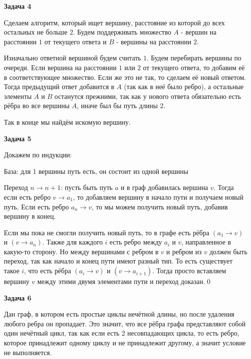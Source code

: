\begin{center}
\textbf{Задача 4}
\end{center}
Сделаем алгоритм, который ищет вершину, расстояние из которой до всех остальных не больше $\displaystyle 2$. Будем поддерживать множество $\displaystyle A$ - вершин на расстоянии $\displaystyle 1$ от текущего ответа и $\displaystyle B$ - вершины на расстоянии $\displaystyle 2$. 

Изначально ответной вершиной будем считать $\displaystyle 1$. Будем перебирать вершины по очереди. Если вершина на расстоянии $\displaystyle 1$ или $\displaystyle 2$ от текущего ответа, то добавим её в соответствующее множество. Если же это не так, то сделаем её новый ответом. Тогда предыдущий ответ добавится в $\displaystyle A$ (так как в неё было ребро), а остальные элементы $\displaystyle A$ и $\displaystyle B$ останутся прежними, так как у нового ответа обязательно есть рёбра во все вершины $\displaystyle A$, иначе был бы путь длины $\displaystyle 2$.

Так в конце мы найдём искомую вершину.

\begin{center}
\textbf{Задача 5}
\end{center}
Докажем по индукции:

База: для 1 вершины путь есть, он состоит из одной вершины

Переход $\displaystyle n\rightarrow n+1$: пусть быть путь $\displaystyle a$ и в граф добавилась вершина $\displaystyle v$. Тогда если есть ребро $\displaystyle v\rightarrow a_{1}$, то добавляем вершину в начало пути и получаем новый путь. Если есть ребро $\displaystyle a_{n}\rightarrow v$, то мы можем получить новый путь, добавив вершину в конец.

Если мы пока не смогли получить новый путь, то в графе есть рёбра $\displaystyle \left( a_{1}\rightarrow v\right)$ и $\displaystyle \left( v\rightarrow a_{n}\right)$. Также для каждого $\displaystyle i$ есть ребро между $\displaystyle a_{i}$ и $\displaystyle v$, направленное в какую-то сторону. Но между вершинами с ребром в $\displaystyle v$ и ребром из $\displaystyle v$ должен быть переход, так как начало и конец пути имеют разный тип. То есть существует такое $\displaystyle i$, что есть рёбра $\displaystyle \left( a_{i}\rightarrow v\right)$ и $\displaystyle \left( v\rightarrow a_{i+1}\right)$. Тогда просто вставляем вершину $\displaystyle v$ между этими двумя элементами пути и переход доказан.\qed 

\begin{center}
\textbf{Задача 6}
\end{center}
Дан граф, в котором есть простые циклы нечётной длины, но после удаления любого ребра он пропадает. Это значит, что все рёбра графа представляют собой один нечётный цикл, так как если есть 2 несовпадающих цикла, то есть ребро, которое принадлежит одному циклу и не принадлежит другому, а значит условие не выполняется.

